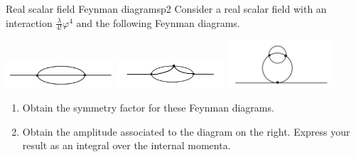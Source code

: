 \begin{problem}{Real scalar field Feynman diagrams}{p2}
   Consider a real scalar field with an interaction \(\frac{\lambda}{4!} \varphi^4\) and the following Feynman diagrams.
   \begin{center}
      \includegraphics[width=0.3\textwidth]{p2i.png}
      \includegraphics[width=0.3\textwidth]{p2ii.png}
      \includegraphics[width=0.3\textwidth]{p2iii.png}
   \end{center}
   \begin{enumerate}[label=(\alph*)]
       \item Obtain the symmetry factor for these Feynman diagrams.
       \item Obtain the amplitude associated to the diagram on the right. Express your result as an integral over the internal momenta.
   \end{enumerate}
\end{problem}
